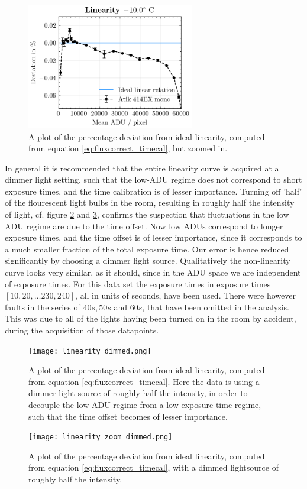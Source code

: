 \documentclass[../main.tex]{subfiles}
\begin{document}
		\begin{figure}
			\centering			\includegraphics[width=0.65\textwidth]{linearity_zoom.png}
			\caption{A plot of the percentage deviation from ideal linearity, computed from equation \ref{eq:fluxcorrect_timecal}, but zoomed in.}
			\label{fig:linearityzoom}
		\end{figure}
		In general it is recommended that the entire linearity curve is acquired at a dimmer light setting, such that the low-ADU regime does not correspond to short exposure times, and the time calibration is of lesser importance. Turning off 'half' of the flourescent light bulbs in the room, resulting in roughly half the intensity of light, cf. figure \ref{fig:linearitydim} and \ref{fig:linearitydimzoom}, confirms the suspection that fluctuations in the low ADU regime are due to the time offset. Now low ADUs correspond to longer exposure times, and the time offset is of lesser importance, since it corresponds to a much smaller fraction of the total exposure time. Our error is hence reduced significantly by choosing a dimmer light source. Qualitatively the non-linearity curve looks very similar, as it should, since in the ADU space we are independent of exposure times. For this data set the exposure times in exposure times
		$[10, 20, \dots 230, 240]$, all in units of seconds, have been used. There were however faults in the series of $40s, 50s$ and $60s$, that have been omitted in the analysis. This was due to all of the lights having been turned on in the room by accident, during the acquisition of those datapoints.
		\begin{figure}
			\centering			\texttt{[image: linearity\_dimmed.png]}
			\caption{A plot of the percentage deviation from ideal linearity, computed from equation \ref{eq:fluxcorrect_timecal}. Here the data is using a dimmer light source of roughly half the intensity, in order to decouple the low ADU regime from a low exposure time regime, such that the time offset becomes of lesser importance.}
			\label{fig:linearitydim}
		\end{figure}
	\begin{figure}
		\centering			\texttt{[image: linearity\_zoom\_dimmed.png]}
		\caption{A plot of the percentage deviation from ideal linearity, computed from equation \ref{eq:fluxcorrect_timecal}, with a dimmed lightsource of roughly half the intensity.}
		\label{fig:linearitydimzoom}
	\end{figure}
		
\end{document}
